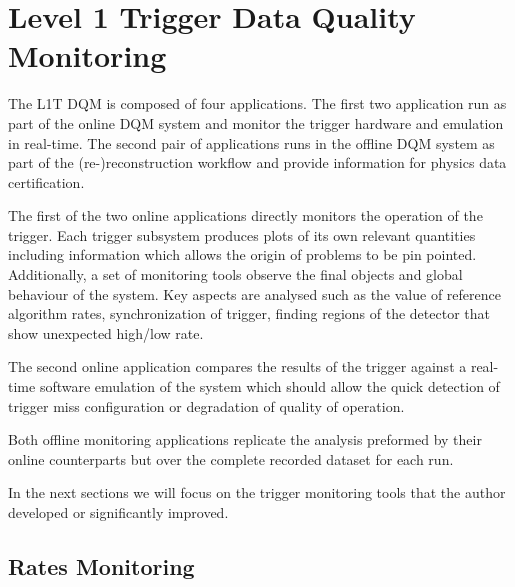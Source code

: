 \section{Level 1 Trigger Data Quality Monitoring}
\label{SECTION:TechnicalWork_L1TDQM}


The \gls{L1T} \gls{DQM} is composed of four applications. The first two application run as part of the online \gls{DQM} system and monitor the trigger hardware and emulation in real-time. The second pair of applications runs in the offline \gls{DQM} system as part of the (re-)reconstruction workflow and provide information for physics data certification.

The first of the two online applications directly monitors the operation of the trigger. Each trigger subsystem produces plots of its own relevant quantities including information which allows the origin of problems to be pin pointed. Additionally, a set of monitoring tools observe the final objects and global behaviour of the system. Key aspects are analysed such as the value of reference algorithm rates, synchronization of trigger, finding regions of the detector that show unexpected high/low rate. 

The second online application compares the results of the trigger against a real-time software emulation of the system which should allow the quick detection of trigger miss configuration or degradation of quality of operation.

Both offline monitoring applications replicate the analysis preformed by their online counterparts but over the complete recorded dataset for each run.

In the next sections we will focus on the trigger monitoring tools that the author developed or significantly improved.

\subsection{Rates Monitoring}
\label{SECTION:TechnicalWork_L1TDQM_RatesMonitoring}

